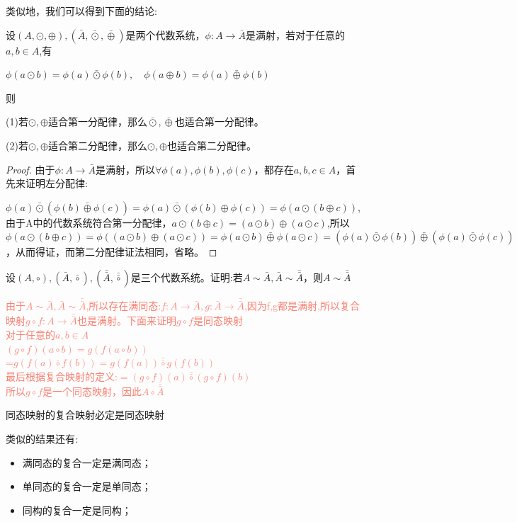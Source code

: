 \documentclass[
	11pt, %
	fleqn, %
	a4paper, %
]{LegrandOrangeBook}
\begin{document}
类似地，我们可以得到下面的结论:
\begin{theorem}
	设$(A,\odot,\oplus),(\bar{A},\bar{\odot},\bar{\oplus})$是两个代数系统，$\phi:A\rightarrow\bar{A}$是满射，若对于任意的$a,b\in A$,有

	$\phi(a\odot b)=\phi(a)\bar{\odot}\phi(b),\quad \phi(a\oplus b)=\phi(a)\bar{\oplus}\phi(b)$

	则

	(1)若$\odot,\oplus$适合第一分配律，那么$\bar{\odot},\bar{\oplus}$也适合第一分配律。

	(2)若$\odot,\oplus$适合第二分配律，那么$\odot,\oplus$也适合第二分配律。
\end{theorem}

\begin{proof}
	由于$\phi:A\rightarrow\bar{A}$是满射，所以$\forall \phi(a),\phi(b),\phi(c)$，都存在$a,b,c\in A$，首先来证明左分配律:

	$\phi(a)\bar{\odot}(\phi(b)\bar{\oplus}\phi(c))=\phi(a)\bar{\odot}(\phi(b)\oplus\phi(c))=\phi(a\odot (b\oplus c))$,由于A中的代数系统符合第一分配律，$a\odot(b\oplus c)=(a\odot b)\oplus(a\odot c)$,所以$\phi(a\odot(b\oplus c))=\phi((a\odot b)\oplus(a\odot c))=\phi(a\odot b)\bar{\oplus}\phi(a\odot c)=(\phi(a)\bar{\odot}\phi(b))\bar{\oplus}(\phi(a)\bar{\odot}\phi(c))$，从而得证，而第二分配律证法相同，省略。
\end{proof}

\begin{example}
	设$(A,\circ),(\bar{A},\bar{\circ}),(\bar{\bar{A}},\bar{\bar{\circ}})$是三个代数系统。证明:若$A\sim\bar{A},\bar{A}\sim\bar{\bar{A}}$，则$A\sim\bar{\bar{A}}$

	\textcolor{Salmon}{由于$A\sim\bar{A},\bar{A}\sim\bar{\bar{A}}$,所以存在满同态:$f:A\rightarrow \bar{A},g:\bar{A}\rightarrow\bar{\bar{A}}$,因为f,g都是满射,所以复合映射$g\circ f:A\rightarrow\bar{\bar{A}}$也是满射。下面来证明$g\circ f$是同态映射\\对于任意的$a,b\in A$\\$(g\circ f)(a\circ b)=g(f(a\circ b))$\\=$g(f(a)\bar{\circ}f(b))=g(f(a))\bar{\bar{\circ}}g(f(b))$\\最后根据复合映射的定义:$=(g\circ f)(a)\bar{\bar{\circ}}(g\circ f)(b)$\\所以$g\circ f$是一个同态映射，因此$A\circ\bar{\bar{A}}$}
\end{example}


\begin{theorem}
	同态映射的复合映射必定是同态映射
\end{theorem}
类似的结果还有:
\begin{itemize}
	\item 满同态的复合一定是满同态；
	\item 单同态的复合一定是单同态；
	\item 同构的复合一定是同构；
\end{itemize}
\end{document}
